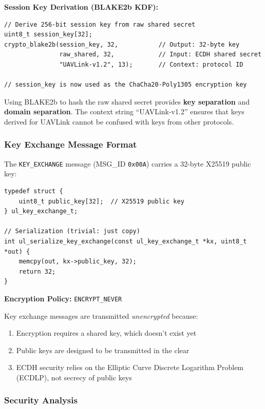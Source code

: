 \documentclass[11pt,a4paper]{article}
\begin{document}
\textbf{Session Key Derivation (BLAKE2b KDF):}
\begin{lstlisting}
// Derive 256-bit session key from raw shared secret
uint8_t session_key[32];
crypto_blake2b(session_key, 32,           // Output: 32-byte key
               raw_shared, 32,            // Input: ECDH shared secret
               "UAVLink-v1.2", 13);       // Context: protocol ID

// session_key is now used as the ChaCha20-Poly1305 encryption key
\end{lstlisting}

\begin{notebox}
Using BLAKE2b to hash the raw shared secret provides \textbf{key separation} and \textbf{domain separation}. The context string ``UAVLink-v1.2'' ensures that keys derived for UAVLink cannot be confused with keys from other protocols.
\end{notebox}

\subsubsection{Key Exchange Message Format}

The \texttt{KEY\_EXCHANGE} message (MSG\_ID \texttt{0x00A}) carries a 32-byte X25519 public key:

\begin{lstlisting}
typedef struct {
    uint8_t public_key[32];  // X25519 public key
} ul_key_exchange_t;

// Serialization (trivial: just copy)
int ul_serialize_key_exchange(const ul_key_exchange_t *kx, uint8_t *out) {
    memcpy(out, kx->public_key, 32);
    return 32;
}
\end{lstlisting}

\textbf{Encryption Policy:} \texttt{ENCRYPT\_NEVER}

Key exchange messages are transmitted \emph{unencrypted} because:
\begin{enumerate}[noitemsep]
    \item Encryption requires a shared key, which doesn't exist yet
    \item Public keys are designed to be transmitted in the clear
    \item ECDH security relies on the Elliptic Curve Discrete Logarithm Problem (ECDLP), not secrecy of public keys
\end{enumerate}

\subsubsection{Security Analysis}
\end{document}
